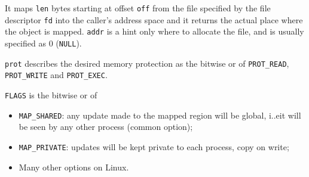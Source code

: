 It maps \texttt{len} bytes starting at offset \texttt{off} from the file specified by the file descriptor \texttt{fd} into the caller's address space and it returns the actual place where the object is mapped. \texttt{addr} is a hint only where to allocate the file, and is usually specified as 0 (\texttt{NULL}).

\texttt{prot} describes the desired memory protection as the bitwise or of \texttt{PROT\_READ}, \texttt{PROT\_WRITE} and \texttt{PROT\_EXEC}.

\texttt{FLAGS} is the bitwise or of
\begin{itemize}
\item \texttt{MAP\_SHARED}: any update made to the mapped region will be global, i..e\@ it will be seen by any other process (common option);
\item \texttt{MAP\_PRIVATE}: updates will be kept private to each process, copy on write;
\item Many other options on Linux.
\end{itemize}